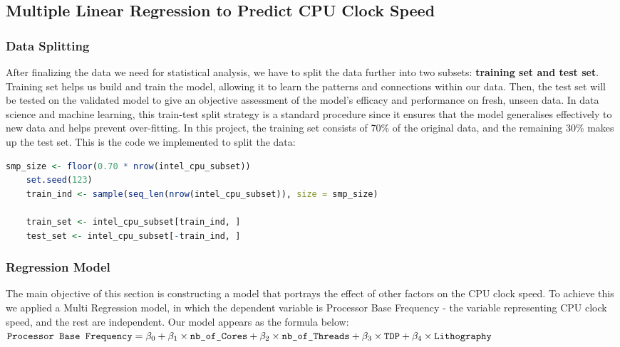\subsection{Multiple Linear Regression to Predict CPU Clock Speed}

\subsubsection{Data Splitting}
After finalizing the data we need for statistical analysis, we have to split the data further into two subsets: \textbf{training set and test set}. Training set helps us build and train the model, allowing it to learn the patterns and connections within our data. Then, the test set will be tested on the validated model to give an objective assessment of the model's efficacy and performance on fresh, unseen data. In data science and machine learning, this train-test split strategy is a standard procedure since it ensures that the model generalises effectively to new data and helps prevent over-fitting. In this project, the training set consists of 70\% of the original data, and the remaining 30\% makes up the test set. This is the code we implemented to split the data:

\begin{lstlisting}[language=R]
    smp_size <- floor(0.70 * nrow(intel_cpu_subset))
    set.seed(123)
    train_ind <- sample(seq_len(nrow(intel_cpu_subset)), size = smp_size)
    
    train_set <- intel_cpu_subset[train_ind, ]
    test_set <- intel_cpu_subset[-train_ind, ]
\end{lstlisting}

\subsubsection{Regression Model}
The main objective of this section is constructing a model that portrays the effect of other factors on the CPU clock speed. To achieve this we applied a Multi Regression model, in which the dependent variable is Processor Base Frequency - the variable representing CPU clock speed, and the rest are independent. Our model appears as the formula below:\\

$\text{\texttt{Processor Base Frequency}} = \beta_0 + \beta_1 \times\text{\texttt{nb\_of\_Cores}} + \beta_2 \times\text{\texttt{nb\_of\_Threads}} + \beta_3 \times\text{\texttt{TDP}} + \beta_4 \times\text{\texttt{Lithography}}$ \\

